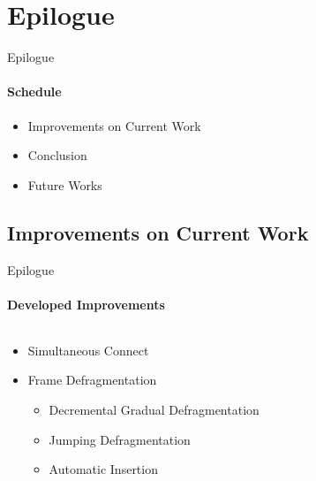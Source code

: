 \section{Epilogue}
     \begin{frame}[t]{Epilogue}\framesubtitle{Schedule}
        \begin{itemize}
            \item Improvements on Current Work
            \item Conclusion
            \item Future Works
        \end{itemize}
    \end{frame}

    \subsection{Improvements on Current Work}
        \begin{frame}[t]{Epilogue}\framesubtitle{Developed Improvements}
            \begin{columns}[T]
                \begin{column}{0.48\textwidth}
                    \begin{itemize}
                        \item Simultaneous Connect
                        \item Frame Defragmentation
                            \begin{itemize}
                                \item Decremental Gradual Defragmentation
                                \item Jumping Defragmentation
                                \item Automatic Insertion
                            \end{itemize}
                    \end{itemize}
                \end{column}
                \begin{column}{.48\textwidth}
                    \begin{figure}
                    \end{figure}
                \end{column}
            \end{columns}
        \end{frame}
